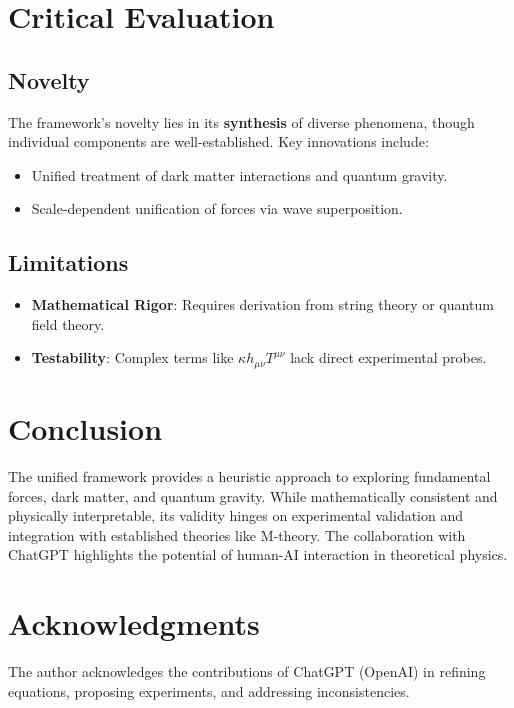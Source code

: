 \documentclass[12pt, a4paper]{article}
\begin{document}
\section{Critical Evaluation}
\subsection{Novelty}
The framework's novelty lies in its \textbf{synthesis} of diverse phenomena, though individual components are well-established. Key innovations include:
\begin{itemize}
    \item Unified treatment of dark matter interactions and quantum gravity.
    \item Scale-dependent unification of forces via wave superposition.
\end{itemize}

\subsection{Limitations}
\begin{itemize}
    \item \textbf{Mathematical Rigor}: Requires derivation from string theory or quantum field theory.
    \item \textbf{Testability}: Complex terms like \( \kappa h_{\mu\nu} T^{\mu\nu} \) lack direct experimental probes.
\end{itemize}

\section{Conclusion}
The unified framework provides a heuristic approach to exploring fundamental forces, dark matter, and quantum gravity. While mathematically consistent and physically interpretable, its validity hinges on experimental validation and integration with established theories like M-theory. The collaboration with ChatGPT highlights the potential of human-AI interaction in theoretical physics.

\section*{Acknowledgments}
The author acknowledges the contributions of ChatGPT (OpenAI) in refining equations, proposing experiments, and addressing inconsistencies.



\end{document}
